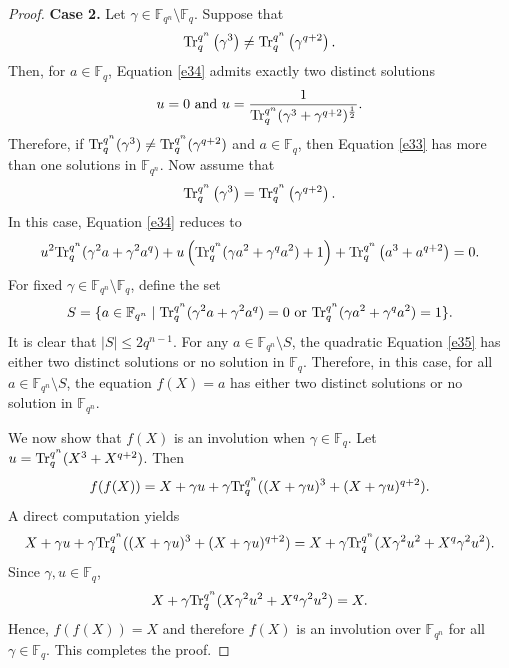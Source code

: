 \documentclass[11pt]{amsart}
\theoremstyle{plain}
\numberwithin{equation}{section}
\theoremstyle{definition}
\newcommand{\F}{\mathbb F}
\def\Tr{{\rm Tr}}
\begin{document}
\begin{proof}
    \textbf{Case 2.} Let $\gamma \in \F_{q^n} \setminus \F_{q}.$ Suppose that 
    $$\Tr_{q}^{q^n}\left(\gamma^3\right)\neq \Tr_{q}^{q^n}\left(\gamma^{q+2}\right).$$ 
    Then, for $a\in \F_q$, Equation \eqref{e34} admits exactly two distinct solutions $$u=0 \text{ and } u=\frac{1}{\Tr_{q}^{q^n}(\gamma^3+\gamma^{q+2})^{\frac{1}{2}}}.$$
    Therefore, if $\Tr_{q}^{q^n}(\gamma^3)\neq \Tr_{q}^{q^n}(\gamma^{q+2})$ and $a\in \F_q$, then Equation \eqref{e33} has more than one solutions in $\F_{q^n}.$ Now assume that 
    $$\Tr_{q}^{q^n}\left(\gamma^3\right)=\Tr_{q}^{q^n}\left(\gamma^{q+2}\right).$$
    In this case, Equation \eqref{e34} reduces to 
    \begin{equation}\label{e35}
        u^2\Tr_{q}^{q^n}(\gamma^2a+\gamma^2a^q)+u\left(\Tr_{q}^{q^n}(\gamma a^2+\gamma^qa^2)+1\right)+\Tr_{q}^{q^n}\left(a^3+a^{q+2}\right)=0.
    \end{equation}
    For fixed $\gamma \in \F_{q^n} \setminus \F_q$, define the set 
    $$S=\{a \in \F_{q^n} \mid \Tr_{q}^{q^n}(\gamma^2 a+\gamma^2a^q)=0 \text{ or } \Tr_{q}^{q^n}(\gamma a^2+\gamma^q a^2)=1\}.$$
    It is clear that $|S|\leq 2q^{n-1}$. For any $a \in \F_{q^n} \setminus S$, the quadratic Equation \eqref{e35} has either two distinct solutions or no solution in $\F_q$. Therefore, in this case, for all $a \in \F_{q^n} \setminus S$, the equation $f(X)=a$ has either two distinct solutions or no solution in $\F_{q^n}.$

    We now show that $f(X)$ is an involution when $\gamma \in \F_{q}.$ Let $u=\Tr_{q}^{q^n}(X^3+X^{q+2})$. Then 
    $$f(f(X))=X+\gamma u+\gamma \Tr_{q}^{q^n}((X+\gamma u)^3+(X+\gamma u)^{q+2}).$$
 A direct computation yields
    $$X+\gamma u+\gamma \Tr_{q}^{q^n}((X+\gamma u)^3+(X+\gamma u)^{q+2})=X+\gamma \Tr_{q}^{q^n}(X\gamma^2u^2+X^q\gamma^2u^2).$$
    Since $\gamma,u \in \F_q$,
    $$X+\gamma \Tr_{q}^{q^n}(X\gamma^2u^2+X^q\gamma^2u^2)=X.$$
     Hence, $f(f(X))=X$ and therefore $f(X)$ is an involution over
$\F_{q^n}$ for all $\gamma \in \F_q$.
This completes the proof.
\end{proof}
\end{document}
